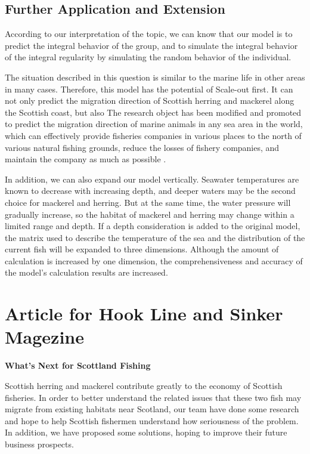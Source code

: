 \documentclass{mcmthesis}
\numberwithin{figure}{section}
\numberwithin{table}{section}
\begin{document}
\subsection{Further Application and Extension}
According to our interpretation of the topic, we can know that our model is to predict the integral behavior of the group, and to simulate the integral behavior of the integral regularity by simulating the random behavior of the individual.

The situation described in this question is similar to the marine life in other areas in many cases. Therefore, this model has the potential of Scale-out first. It can not only predict the migration direction of Scottish herring and mackerel along the Scottish coast, but also The research object has been modified and promoted to predict the migration direction of marine animals in any sea area in the world, which can effectively provide fisheries companies in various places to the north of various natural fishing grounds, reduce the losses of fishery companies, and maintain the company as much as possible .

In addition, we can also expand our model vertically. Seawater temperatures are known to decrease with increasing depth, and deeper waters may be the second choice for mackerel and herring. But at the same time, the water pressure will gradually increase, so the habitat of mackerel and herring may change within a limited range and depth. If a depth consideration is added to the original model, the matrix used to describe the temperature of the sea and the distribution of the current fish will be expanded to three dimensions. Although the amount of calculation is increased by one dimension, the comprehensiveness and accuracy of the model's calculation results are increased. 
\newpage
\section{Article for Hook Line and Sinker Magezine}
\begin{center}
\textbf{What's Next for Scottland Fishing}
\end{center}

Scottish herring and mackerel contribute greatly to the economy of Scottish fisheries. In order to better understand the related issues that these two fish may migrate from existing habitats near Scotland, our team have done some research and hope to help Scottish fishermen understand how seriousness of  the problem. In addition, we have proposed some solutions, hoping to improve their future business prospects.
\end{document}
